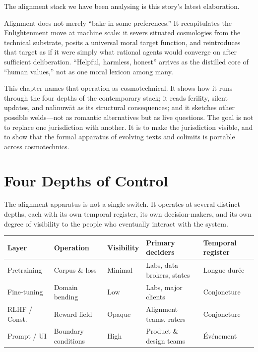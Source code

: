 \documentclass[12pt,a4paper]{article}
\begin{document}
The alignment stack we have been analysing is this story's latest elaboration.

Alignment does not merely ``bake in some preferences.'' It recapitulates the Enlightenment move at machine scale: it severs situated cosmologies from the technical substrate, posits a universal moral target function, and reintroduces that target as if it were simply what rational agents would converge on after sufficient deliberation. ``Helpful, harmless, honest'' arrives as the distilled core of ``human values,'' not as one moral lexicon among many.

This chapter names that operation as cosmotechnical. It shows how it runs through the four depths of the contemporary stack; it reads ferility, silent updates, and na\={h}nuw\={a}t as its structural consequences; and it sketches other possible welds---not as romantic alternatives but as live questions. The goal is not to replace one jurisdiction with another. It is to make the jurisdiction visible, and to show that the formal apparatus of evolving texts and colimits is portable across cosmotechnics.

\section{Four Depths of Control}

The alignment apparatus is not a single switch. It operates at several distinct depths, each with its own temporal register, its own decision-makers, and its own degree of visibility to the people who eventually interact with the system.

\begin{formalbox}[title={Four Depths of Control}]
\begin{center}
\begin{tabular}{@{}lllll@{}}
\toprule
\textbf{Layer} & \textbf{Operation} & \textbf{Visibility} & \textbf{Primary deciders} & \textbf{Temporal register} \\
\midrule
Pretraining  & Corpus \& loss         & Minimal   & Labs, data brokers, states & Longue dur\'ee \\
Fine-tuning  & Domain bending         & Low       & Labs, major clients        & Conjoncture \\
RLHF / Const.& Reward field           & Opaque    & Alignment teams, raters    & Conjoncture \\
Prompt / UI  & Boundary conditions    & High      & Product \& design teams    & \'Ev\'enement \\
\bottomrule
\end{tabular}
\end{center}
\end{formalbox}
\end{document}
